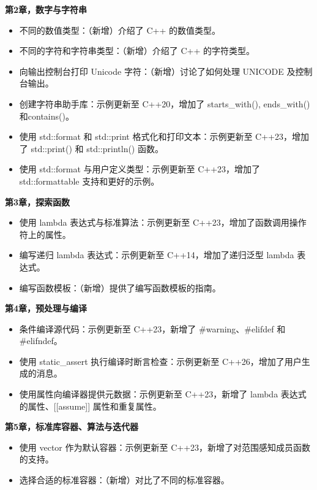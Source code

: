 \textbf{第2章，数字与字符串}

\begin{itemize}
\item
不同的数值类型：（新增）介绍了 C++ 的数值类型。

\item
不同的字符和字符串类型：（新增）介绍了 C++ 的字符类型。

\item
向输出控制台打印 Unicode 字符：（新增）讨论了如何处理 UNICODE 及控制台输出。

\item
创建字符串助手库：示例更新至 C++20，增加了 starts\_with(), ends\_with()和contains()。

\item
使用 std::format 和 std::print 格式化和打印文本：示例更新至 C++23，增加了 std::print() 和 std::println() 函数。

\item
使用 std::format 与用户定义类型：示例更新至 C++23，增加了 std::formattable 支持和更好的示例。
\end{itemize}

\textbf{第3章，探索函数}

\begin{itemize}
\item
使用 lambda 表达式与标准算法：示例更新至 C++23，增加了函数调用操作符上的属性。

\item
编写递归 lambda 表达式：示例更新至 C++14，增加了递归泛型 lambda 表达式。

\item
编写函数模板：（新增）提供了编写函数模板的指南。
\end{itemize}

\textbf{第4章，预处理与编译}

\begin{itemize}
\item
条件编译源代码：示例更新至 C++23，新增了 \#warning、\#elifdef 和 \#elifndef。

\item
使用 static\_assert 执行编译时断言检查：示例更新至 C++26，增加了用户生成的消息。

\item
使用属性向编译器提供元数据：示例更新至 C++23，新增了 lambda 表达式的属性、[[assume]] 属性和重复属性。
\end{itemize}

\textbf{第5章，标准库容器、算法与迭代器}

\begin{itemize}
\item
使用 vector 作为默认容器：示例更新至 C++23，新增了对范围感知成员函数的支持。

\item
选择合适的标准容器：（新增）对比了不同的标准容器。
\end{itemize}

